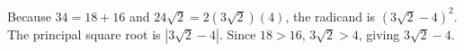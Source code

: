 Because $34=18+16$ and $24\sqrt2=2(3\sqrt2)(4)$, the radicand is $(3\sqrt2-4)^2$. The principal square root is $|3\sqrt2-4|$. Since $18>16$, $3\sqrt2>4$, giving $\boxed{3\sqrt2-4}$.
